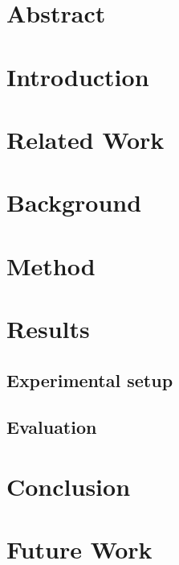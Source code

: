 \documentclass[a4paper, 12pt]{article}
\begin{document}


\setcounter{page}{2}
\tableofcontents
\newpage

\listoftodos
\section*{Abstract}


\section{Introduction}



\section{Related Work}


\section{Background}


\section{Method}


\section{Results}
\subsection{Experimental setup}
\subsection{Evaluation}
\section{Conclusion}
\section{Future Work}

\printbibliography
\end{document}
